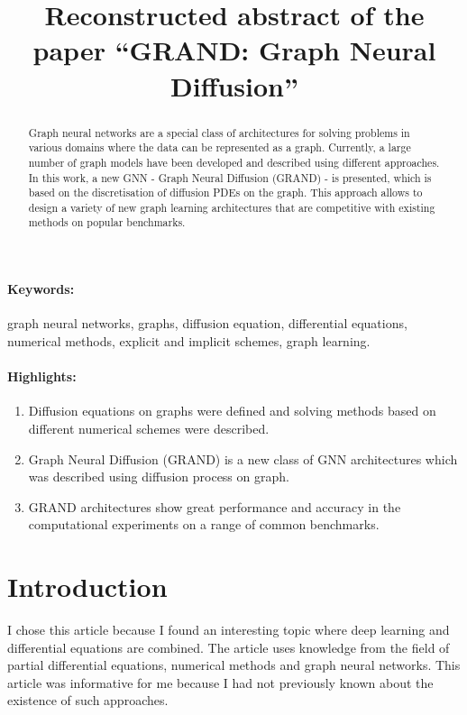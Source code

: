 \documentclass[12pt]{article}
\title{Reconstructed abstract of the paper ``GRAND: Graph Neural Diffusion''}
\date{}
\begin{document}
\maketitle

\begin{abstract}
Graph neural networks are a special class of architectures for solving problems in various domains where the data can be represented as a graph. Currently, a large number of graph models have been developed and described using different approaches. In this work, a new GNN - Graph Neural Diffusion (GRAND) - is presented, which is based on the discretisation of diffusion PDEs on the graph. This approach allows to design a variety of new graph learning architectures that are competitive with existing methods on popular benchmarks.
\end{abstract}
\paragraph{Keywords:} graph neural networks, graphs, diffusion equation, differential equations, numerical methods, explicit and implicit schemes, graph learning.

\paragraph{Highlights:}
\begin{enumerate}
\item Diffusion equations on graphs were defined and solving methods based on different numerical schemes were described.
\item Graph Neural Diffusion (GRAND) is a new class of GNN architectures which was described using diffusion process on graph.
\item GRAND architectures show great performance and accuracy in the computational experiments on a range of common benchmarks.
\end{enumerate}

\section{Introduction}
I chose this article \cite{chamberlain2021} because I found an interesting topic where deep learning and differential equations are combined. The article uses knowledge from the field of partial differential equations, numerical methods and graph neural networks. This article was informative for me because I had not previously known about the existence of such approaches.



\end{document}
